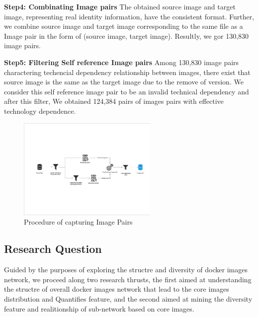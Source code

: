 \documentclass[sigconf]{acmart}
\begin{document}
\noindent\textbf{Step4: Combinating Image pairs} The obtained source image and target image, representing real identity information, have the consistent format. Further, we combine source image and target image corresponding to the same file as a Image pair in the form of (source image, target image). Resultly, we gor 130,830 image pairs. 

\noindent\textbf{Step5: Filtering Self reference Image pairs} Among 130,830 image pairs charactering techencial dependency relationship between images, there exist that source image is the same as the target image due to the remove of version. We consider this self reference image pair to be an invalid technical dependency and after this filter, We obtained 124,384 pairs of images pairs with effective technology dependence. %

 
\begin{figure}[htbp]
\centerline{\includegraphics[width=0.6\textwidth,trim=10 270 10 280,clip]{picture//Dataset process.pdf}}
\caption{Procedure of capturing Image Pairs}
\label{fig}
\end{figure}









\subsection{Research Question}
Guided by the purposes of exploring the structre and diversity of docker images network, we proceed along two research thrusts, the first aimed at understanding the structre of overall docker images network that lead to the core images distribution and Quantifies feature, and the second aimed at mining the diversity feature and realitionship of sub-network based on core images.

\end{document}
